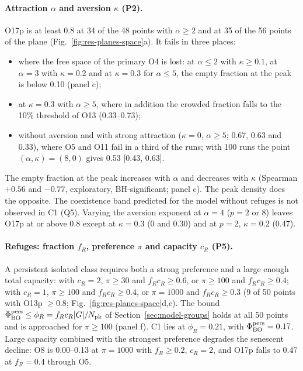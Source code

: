 \paragraph{Attraction $\alpha$ and aversion $\kappa$ (P2).}
O17p is at least 0.8 at 34 of the 48 points with $\alpha\ge2$ and at 35 of the 56 points of the plane
(Fig.~\ref{fig:res-planes-space}a). It fails in three places:
\begin{itemize}
  \item where the free space of the primary O4 is lost: at $\alpha\le2$ with $\kappa\ge0.1$, at $\alpha=3$ with
    $\kappa=0.2$ and at $\kappa=0.3$ for $\alpha\le5$, the empty fraction at the peak is below 0.10 (panel c);
  \item at $\kappa=0.3$ with $\alpha\ge5$, where in addition the crowded fraction falls to the 10\% threshold of O13
    (0.33--0.73);
  \item without aversion and with strong attraction ($\kappa=0$, $\alpha\ge5$; 0.67, 0.63 and 0.33), where O5 and
    O11 fail in a third of the runs; with 100 runs the point $(\alpha,\kappa)=(8,0)$ gives 0.53 [0.43, 0.63].
\end{itemize}
The empty fraction at the peak increases with $\alpha$ and decreases with $\kappa$ (Spearman $+0.56$ and $-0.77$,
exploratory, BH-significant; panel c). The peak density does the opposite. The coexistence band predicted for the
model without refuges is not observed in \textsf{C1} (Q5). Varying the aversion exponent at $\alpha=4$ ($p=2$ or 8)
leaves O17p at or above 0.8 except at $\kappa=0.3$ (0 and 0.30) and at $p=2$, $\kappa=0.2$ (0.47).

\paragraph{Refuges: fraction $f_R$, preference $\pi$ and capacity $c_R$ (P5).}
A persistent isolated class requires both a strong preference and a large enough total capacity: with $c_R=2$,
$\pi\ge30$ and $f_Rc_R\ge0.6$, or $\pi\ge100$ and $f_Rc_R\ge0.4$; with $c_R=1$, $\pi\ge100$ and $f_Rc_R\ge0.4$, or
$\pi=1000$ and $f_Rc_R\ge0.3$ (9 of 50 points with O13p $\ge0.8$; Fig.~\ref{fig:res-planes-space}d,e). The bound
$\Phi^{\rm pers}_{\rm BO}\le\phi_R=f_Rc_R|G|/N_{\rm pk}$ of Section~\ref{sec:model-groups} holds at all 50 points
and is approached for $\pi\ge100$ (panel f). \textsf{C1} lies at $\phi_R=0.21$, with
$\Phi^{\rm pers}_{\rm BO}=0.17$. Large capacity combined with the strongest preference degrades the senescent
decline: O8 is 0.00--0.13 at $\pi=1000$ with $f_R\ge0.2$, $c_R=2$, and O17p falls to 0.47 at $f_R=0.4$ through O5.

